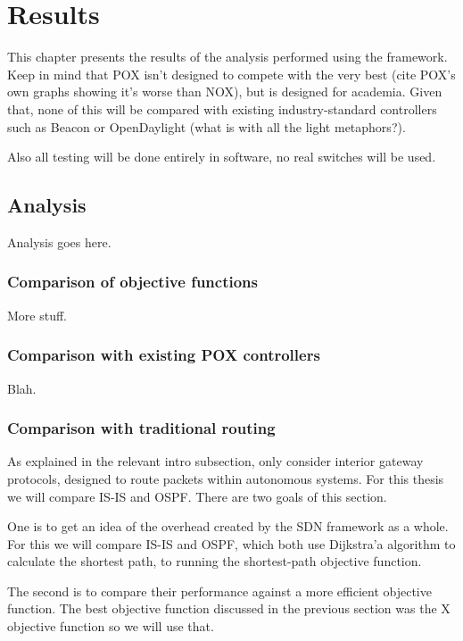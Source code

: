 \chapter{Results}

This chapter presents the results of the analysis performed using the framework. Keep in mind that POX isn't designed to compete with the very best (cite POX's own graphs showing it's worse than NOX), but is designed for academia. Given that, none of this will be compared with existing industry-standard controllers such as Beacon or OpenDaylight (what is with all the light metaphors?).

Also all testing will be done entirely in software, no real switches will be used.

\section{Analysis}
Analysis goes here.

\subsection{Comparison of objective functions}
More stuff.

\subsection{Comparison with existing POX controllers}
Blah.

\subsection{Comparison with traditional routing}
As explained in the relevant intro subsection, only consider interior gateway protocols, designed to route packets within autonomous systems. For this thesis we will compare IS-IS and OSPF. There are two goals of this section. 

One is to get an idea of the overhead created by the SDN framework as a whole. For this we will compare IS-IS and OSPF, which both use Dijkstra'a algorithm to calculate the shortest path, to \thesis{} running the shortest-path objective function.

The second is to compare their performance against a more efficient objective function. The best objective function discussed in the previous section was the X objective function so we will use that.


